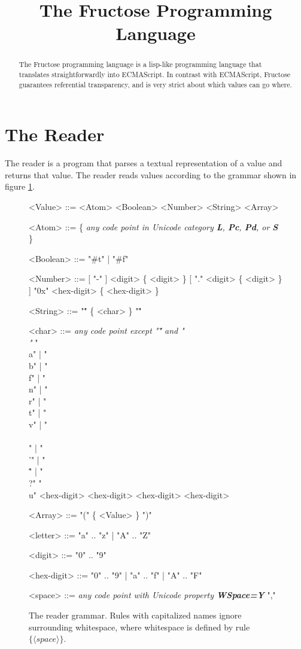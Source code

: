 \documentclass[a4paper]{article}
\title{The Fructose Programming Language}
\begin{document}
\maketitle

\begin{abstract}
The Fructose programming language is a lisp-like programming language that translates straightforwardly into ECMAScript. In contrast with ECMAScript, Fructose guarantees referential transparency, and is very strict about which values can go where.
\end{abstract}

\section{The Reader}

The reader is a program that parses a textual representation of a value and returns that value. The reader reads values according to the grammar shown in figure \ref{fig:readergrammar}.

\begin{figure}[h]
\label{fig:readergrammar}
\caption{The reader grammar. Rules with capitalized names ignore surrounding whitespace, where whitespace is defined by rule $\{ \langle space \rangle \}$.}
\begin{grammar}
<Value> ::= <Atom>
\alt <Boolean>
\alt <Number>
\alt <String>
\alt <Array>

<Atom> ::= \{ {\it any code point in Unicode category {\bf L}, {\bf Pc}, {\bf Pd}, or {\bf S}} \}

<Boolean> ::= "#t" | "#f"

<Number> ::= [ "-" ] <digit> \{ <digit> \} [ "." <digit> \{ <digit> \} ]
\alt "0x" <hex-digit> \{ <hex-digit> \}

<String> ::= "\"" \{ <char> \} "\""

<char> ::= {\it any code point except "\"" and "\\"}
\alt "\\a" | "\\b" | "\\f" | "\\n" | "\\r" | "\\t" | "\\v" | "\\\\" | "\\'" | "\\\"" | "\\?"
\alt "\\u" <hex-digit> <hex-digit> <hex-digit> <hex-digit>

<Array> ::= "(" \{ <Value> \} ")"

<letter> ::= "a" .. "z" | "A" .. "Z"

<digit> ::= "0" .. "9"

<hex-digit> ::= "0" .. "9" | "a" .. "f" | "A" .. "F"

<space> ::= {\it any code point with Unicode property {\bf WSpace=Y}}
\alt ","

\end{grammar}
\end{figure}
\end{document}
